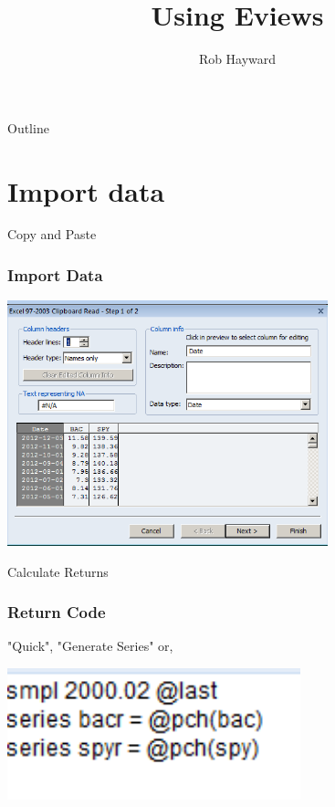 \documentclass[14pt,xcolor=pdftex,dvipsnames,table]{beamer}\usepackage[]{graphicx}\usepackage[]{color}
\title{Using Eviews}
\author{Rob Hayward}
\begin{document}
\begin{frame}
\titlepage
\end{frame}

\begin{frame}{Outline}
\tableofcontents
\end{frame}

\section{Import data}
\begin{frame}{Copy and Paste}
\graphicspath{{./Figures/}}
\frametitle{Import Data}
\begin{center}
\includegraphics[height = 2.8in]{Import}
\end{center}
\end{frame} 


\begin{frame}{Calculate Returns}
\graphicspath{{./Figures/}}
\frametitle{Return Code}
"Quick", "Generate Series" or, 
\begin{center}
\includegraphics[height = 1.5in]{Returncode}
\end{center}
\end{frame} 
\end{document}
